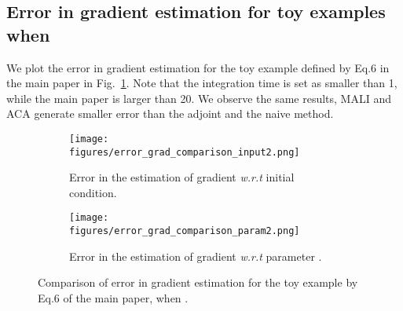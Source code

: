\documentclass{article} \usepackage{iclr2021_conference,times}
\begin{document}
\subsection{Error in gradient estimation for toy examples when }
We plot the error in gradient estimation for the toy example defined by Eq.6 in the main paper in Fig.~\ref{sup:fig:toy}. Note that the integration time  is set as smaller than 1, while the main paper is larger than 20. We observe the same results, MALI and ACA generate smaller error than the adjoint and the naive method.
\begin{figure}
\begin{subfigure}{0.5\textwidth}
\centering
\texttt{[image: figures/error\_grad\_comparison\_input2.png]}
\caption{Error in the estimation of gradient \textit{w.r.t} initial condition.}
\end{subfigure}
\begin{subfigure}{0.5\textwidth}
\centering
\texttt{[image: figures/error\_grad\_comparison\_param2.png]}
\caption{Error in the estimation of gradient \textit{w.r.t} parameter .}
\end{subfigure}
\caption{Comparison of error in gradient estimation for the toy example by Eq.6 of the main paper, when .}
\label{sup:fig:toy}
\end{figure}
\end{document}
